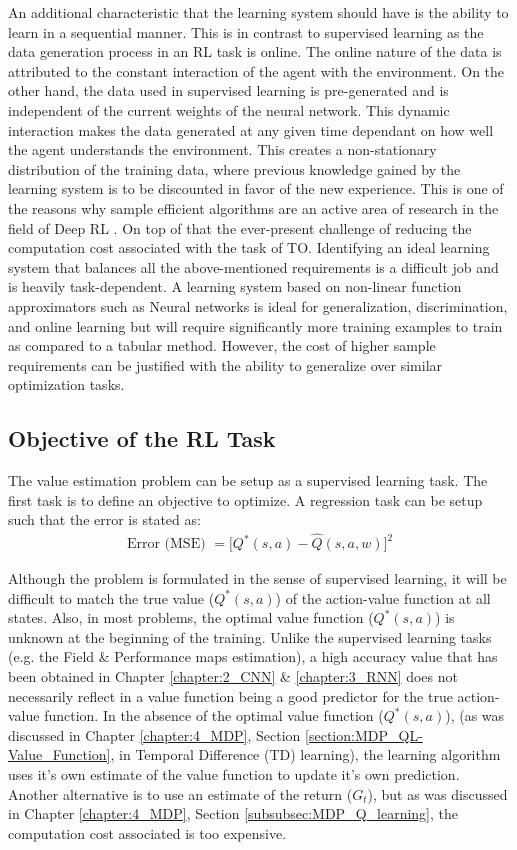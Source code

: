 An additional characteristic that the learning system should have is the ability to learn in a sequential manner. This is in contrast to supervised learning as the data generation process in an RL task is online. The online nature of the data is attributed to the constant interaction of the agent with the environment. On the other hand, the data used in supervised learning is pre-generated and is independent of the current weights of the neural network. This dynamic interaction makes the data generated at any given time dependant on how well the agent understands the environment. This creates a non-stationary distribution of the training data, where previous knowledge gained by the learning system is to be discounted in favor of the new experience. This is one of the reasons why sample efficient algorithms are an active area of research in the field of Deep RL \parencite{henderson2018deep}. On top of that the ever-present challenge of reducing the computation cost associated with the task of TO. Identifying an ideal learning system that balances all the above-mentioned requirements is a difficult job and is heavily task-dependent. A learning system based on non-linear function approximators such as Neural networks is ideal for generalization, discrimination, and online learning but will require significantly more training examples to train as compared to a tabular method. However, the cost of higher sample requirements can be justified with the ability to generalize over similar optimization tasks.

\subsection{Objective of the RL Task}
\label{section:RL_Objective_of_the_RL_Task}
The value estimation problem can be setup as a supervised learning task. The first task is to define an objective to optimize. A regression task can be setup such that the error is stated as:
\begin{align}
    \text{Error (MSE) } = \Big[Q^*(s, a) - \hat{Q}(s, a, w)\Big]^2 \label{eqn:RL_Obj-MSE}
\end{align}

Although the problem is formulated in the sense of supervised learning, it will be difficult to match the true value ($Q^*(s, a)$) of the action-value function at all states. Also, in most problems, the optimal value function ($Q^*(s, a)$) is unknown at the beginning of the training. 
Unlike the supervised learning tasks (e.g. the Field \& Performance maps estimation), a high accuracy value that has been obtained in Chapter \ref{chapter:2_CNN} \& \ref{chapter:3_RNN} does not necessarily reflect in a value function being a good predictor for the true action-value function. In the absence of the optimal value function ($Q^*(s, a)$), (as was discussed in Chapter \ref{chapter:4_MDP}, Section \ref{section:MDP_QL-Value_Function}, in Temporal Difference (TD) learning), the learning algorithm uses it's own estimate of the value function to update it's own prediction. Another alternative is to use an estimate of the return ($G_t$), but as was discussed in Chapter \ref{chapter:4_MDP}, Section \ref{subsubsec:MDP_Q_learning}, the computation cost associated is too expensive.

